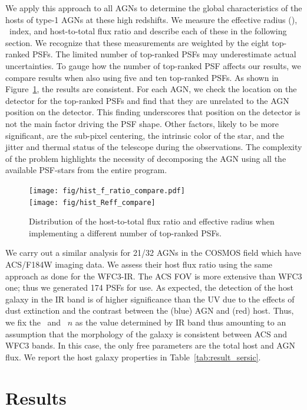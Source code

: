 \documentclass[apj]{emulateapj}
\begin{document}
We apply this approach to all AGNs to determine the global characteristics of the hosts of type-1 AGNs at these high redshifts. We measure the effective radius (\Reff), \sersic\ index, and host-to-total flux ratio and describe each of these in the following section. We recognize that these measurements are weighted by the eight top-ranked PSFs. The limited number of top-ranked PSFs may underestimate actual uncertainties. To gauge how the number of top-ranked PSF affects our results, we compare results when also using five and ten top-ranked PSFs. As shown in Figure~\ref{fig:hist_compare}, the results are consistent. For each AGN, we check the location on the detector for the top-ranked PSFs and find that they are unrelated to the AGN position on the detector. This finding underscores that position on the detector is not the main factor driving the PSF shape. Other factors, likely to be more significant, are the sub-pixel centering, the intrinsic color of the star, and the jitter and thermal status of the telescope during the observations. The complexity of the problem
highlights the necessity of decomposing the AGN using all the available PSF-stars from the entire program.

\begin{figure}
\centering
{
\texttt{[image: fig/hist\_f\_ratio\_compare.pdf]}\\
\texttt{[image: fig/hist\_Reff\_compare]}\\
}
\caption{\label{fig:hist_compare} 
Distribution of the host-to-total flux ratio and effective radius when implementing a different number of top-ranked PSFs.}
\end{figure} 


We carry out a similar analysis for 21/32 AGNs in the COSMOS field which have ACS/F184W imaging data. We assess their host flux ratio using the same approach as done for the WFC3-IR. The ACS FOV is more extensive than WFC3 one; thus we generated 174 PSFs for use. As expected, the detection of the host galaxy in the IR band is of higher significance than the UV due to the effects of dust extinction and the contrast between the (blue) AGN and (red) host. Thus, we fix the \Reff\ and \sersic\ $n$ as the value determined by IR band thus amounting to an assumption that the morphology of the galaxy is consistent between ACS and WFC3 bands. In this case, the only free parameters are the total host and AGN flux. We report the host galaxy properties in Table~\ref{tab:result_sersic}.


\section{Results}
\label{sec:result}
\end{document}
